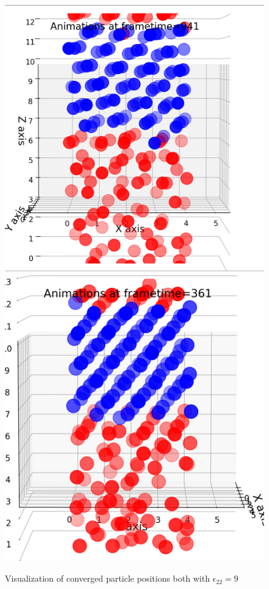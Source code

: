 \documentclass{article}
\begin{document}
		\begin{figure}[H]
				\centering
				\includegraphics[scale=0.3]{config-9-2}
				\includegraphics[scale=0.3]{config-9-1}
				\caption{Visualization of converged particle positions both with $\epsilon _{22}=9$}
		\end{figure}
\end{document}
